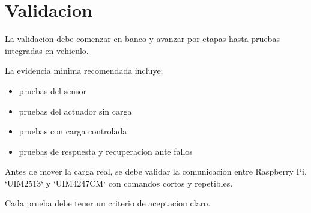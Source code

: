 \chapter{Validacion}

La validacion debe comenzar en banco y avanzar por etapas hasta pruebas integradas en vehiculo.

La evidencia minima recomendada incluye:

\begin{itemize}
  \item pruebas del sensor
  \item pruebas del actuador sin carga
  \item pruebas con carga controlada
  \item pruebas de respuesta y recuperacion ante fallos
\end{itemize}

Antes de mover la carga real, se debe validar la comunicacion entre Raspberry
Pi, `UIM2513` y `UIM4247CM` con comandos cortos y repetibles.

Cada prueba debe tener un criterio de aceptacion claro.

